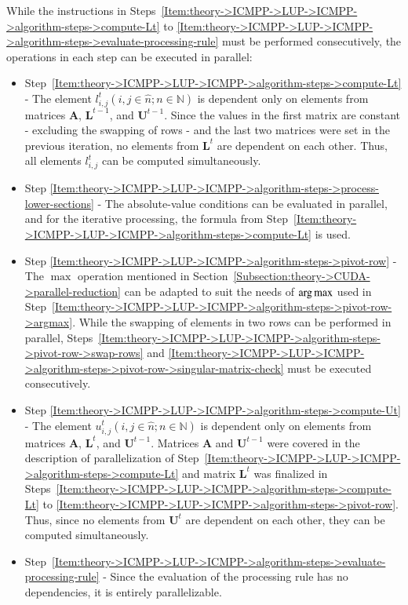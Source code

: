 While the instructions in Steps~\ref{Item:theory->ICMPP->LUP->ICMPP->algorithm-steps->compute-Lt} to \ref{Item:theory->ICMPP->LUP->ICMPP->algorithm-steps->evaluate-processing-rule} must be performed consecutively, the operations in each step can be executed in parallel:

\begin{itemize}
	\item Step~\ref{Item:theory->ICMPP->LUP->ICMPP->algorithm-steps->compute-Lt} - The element $l^{t}_{i,j} \left(i, j \in \widehat{n}; n \in \mathbb{N}\right)$ is dependent only on elements from matrices $\mathbf{A}$, $\mathbf{L}^{t-1}$, and $\mathbf{U}^{t-1}$.
Since the values in the first matrix are constant - excluding the swapping of rows - and the last two matrices were set in the previous iteration, no elements from $\mathbf{L}^{t}$ are dependent on each other.
Thus, all elements $l^{t}_{i,j}$ can be computed simultaneously.
	\item Step \ref{Item:theory->ICMPP->LUP->ICMPP->algorithm-steps->process-lower-sections} - The absolute-value conditions can be evaluated in parallel, and for the iterative processing, the formula from Step~\ref{Item:theory->ICMPP->LUP->ICMPP->algorithm-steps->compute-Lt} is used.
	\item Step \ref{Item:theory->ICMPP->LUP->ICMPP->algorithm-steps->pivot-row} - The $\max$ operation mentioned in Section~\ref{Subsection:theory->CUDA->parallel-reduction} can be adapted to suit the needs of $\operatorname*{arg\,max}$ used in Step~\ref{Item:theory->ICMPP->LUP->ICMPP->algorithm-steps->pivot-row->argmax}.
While the swapping of elements in two rows can be performed in parallel, Steps~\ref{Item:theory->ICMPP->LUP->ICMPP->algorithm-steps->pivot-row->swap-rows} and \ref{Item:theory->ICMPP->LUP->ICMPP->algorithm-steps->pivot-row->singular-matrix-check} must be executed consecutively.
	\item Step \ref{Item:theory->ICMPP->LUP->ICMPP->algorithm-steps->compute-Ut} - The element $u^{t}_{i,j} \left(i, j \in \widehat{n}; n \in \mathbb{N}\right)$ is dependent only on elements from matrices $\mathbf{A}$, $\mathbf{L}^{t}$, and $\mathbf{U}^{t-1}$.
Matrices $\mathbf{A}$ and $\mathbf{U}^{t-1}$ were covered in the description of parallelization of Step~\ref{Item:theory->ICMPP->LUP->ICMPP->algorithm-steps->compute-Lt} and matrix $\mathbf{L}^{t}$ was finalized in Steps~\ref{Item:theory->ICMPP->LUP->ICMPP->algorithm-steps->compute-Lt} to \ref{Item:theory->ICMPP->LUP->ICMPP->algorithm-steps->pivot-row}.
Thus, since no elements from $\mathbf{U}^{t}$ are dependent on each other, they can be computed simultaneously.
	\item Step~\ref{Item:theory->ICMPP->LUP->ICMPP->algorithm-steps->evaluate-processing-rule} - Since the evaluation of the processing rule has no dependencies, it is entirely parallelizable.
\end{itemize}

